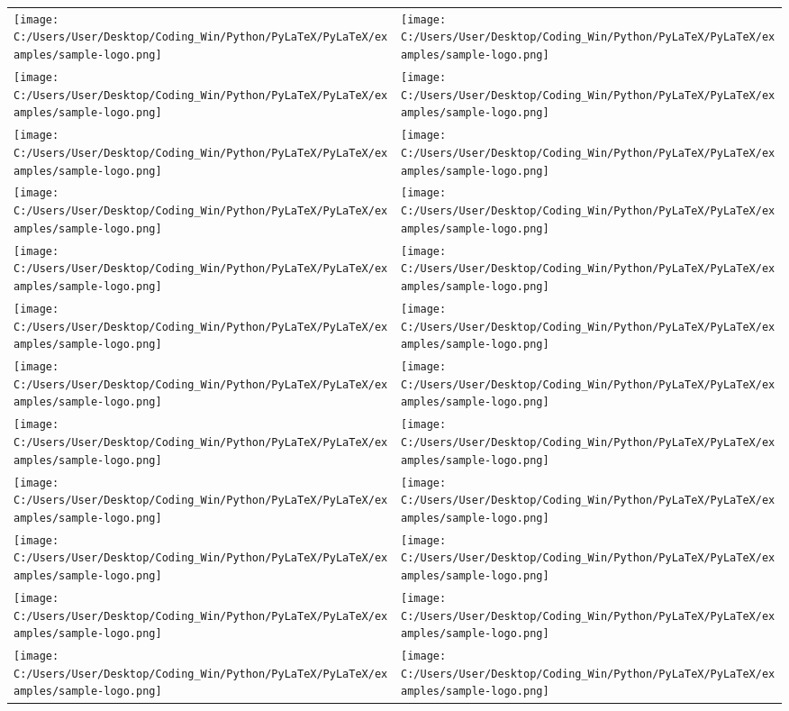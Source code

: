 \documentclass{article}%
\begin{document}
\begin{longtabu}{X[c] X[c]}
\texttt{[image: C:/Users/User/Desktop/Coding\_Win/Python/PyLaTeX/PyLaTeX/examples/sample-logo.png]}&\texttt{[image: C:/Users/User/Desktop/Coding\_Win/Python/PyLaTeX/PyLaTeX/examples/sample-logo.png]}\\%
\texttt{[image: C:/Users/User/Desktop/Coding\_Win/Python/PyLaTeX/PyLaTeX/examples/sample-logo.png]}&\texttt{[image: C:/Users/User/Desktop/Coding\_Win/Python/PyLaTeX/PyLaTeX/examples/sample-logo.png]}\\%
\texttt{[image: C:/Users/User/Desktop/Coding\_Win/Python/PyLaTeX/PyLaTeX/examples/sample-logo.png]}&\texttt{[image: C:/Users/User/Desktop/Coding\_Win/Python/PyLaTeX/PyLaTeX/examples/sample-logo.png]}\\%
\texttt{[image: C:/Users/User/Desktop/Coding\_Win/Python/PyLaTeX/PyLaTeX/examples/sample-logo.png]}&\texttt{[image: C:/Users/User/Desktop/Coding\_Win/Python/PyLaTeX/PyLaTeX/examples/sample-logo.png]}\\%
\texttt{[image: C:/Users/User/Desktop/Coding\_Win/Python/PyLaTeX/PyLaTeX/examples/sample-logo.png]}&\texttt{[image: C:/Users/User/Desktop/Coding\_Win/Python/PyLaTeX/PyLaTeX/examples/sample-logo.png]}\\%
\texttt{[image: C:/Users/User/Desktop/Coding\_Win/Python/PyLaTeX/PyLaTeX/examples/sample-logo.png]}&\texttt{[image: C:/Users/User/Desktop/Coding\_Win/Python/PyLaTeX/PyLaTeX/examples/sample-logo.png]}\\%
\texttt{[image: C:/Users/User/Desktop/Coding\_Win/Python/PyLaTeX/PyLaTeX/examples/sample-logo.png]}&\texttt{[image: C:/Users/User/Desktop/Coding\_Win/Python/PyLaTeX/PyLaTeX/examples/sample-logo.png]}\\%
\texttt{[image: C:/Users/User/Desktop/Coding\_Win/Python/PyLaTeX/PyLaTeX/examples/sample-logo.png]}&\texttt{[image: C:/Users/User/Desktop/Coding\_Win/Python/PyLaTeX/PyLaTeX/examples/sample-logo.png]}\\%
\texttt{[image: C:/Users/User/Desktop/Coding\_Win/Python/PyLaTeX/PyLaTeX/examples/sample-logo.png]}&\texttt{[image: C:/Users/User/Desktop/Coding\_Win/Python/PyLaTeX/PyLaTeX/examples/sample-logo.png]}\\%
\texttt{[image: C:/Users/User/Desktop/Coding\_Win/Python/PyLaTeX/PyLaTeX/examples/sample-logo.png]}&\texttt{[image: C:/Users/User/Desktop/Coding\_Win/Python/PyLaTeX/PyLaTeX/examples/sample-logo.png]}\\%
\texttt{[image: C:/Users/User/Desktop/Coding\_Win/Python/PyLaTeX/PyLaTeX/examples/sample-logo.png]}&\texttt{[image: C:/Users/User/Desktop/Coding\_Win/Python/PyLaTeX/PyLaTeX/examples/sample-logo.png]}\\%
\texttt{[image: C:/Users/User/Desktop/Coding\_Win/Python/PyLaTeX/PyLaTeX/examples/sample-logo.png]}&\texttt{[image: C:/Users/User/Desktop/Coding\_Win/Python/PyLaTeX/PyLaTeX/examples/sample-logo.png]}\\%
\end{longtabu}%
\end{document}
